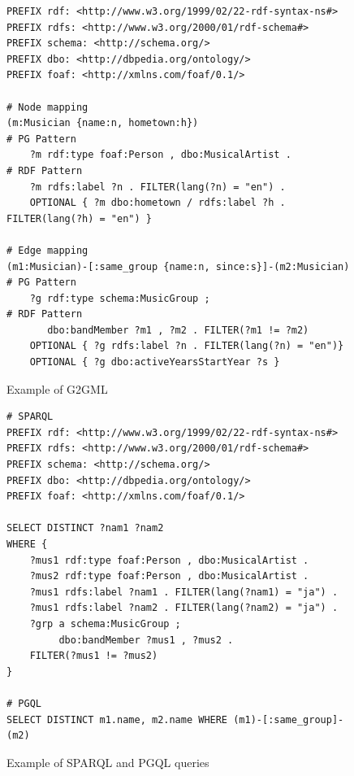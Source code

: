 \documentclass[runningheads]{llncs}
\begin{document}
\begin{figure}[!t]
\vspace{2mm}
\begin{scriptsize}
\begin{verbatim}
PREFIX rdf: <http://www.w3.org/1999/02/22-rdf-syntax-ns#>
PREFIX rdfs: <http://www.w3.org/2000/01/rdf-schema#>
PREFIX schema: <http://schema.org/>
PREFIX dbo: <http://dbpedia.org/ontology/>
PREFIX foaf: <http://xmlns.com/foaf/0.1/>
 
# Node mapping
(m:Musician {name:n, hometown:h})                            # PG Pattern
    ?m rdf:type foaf:Person , dbo:MusicalArtist .            # RDF Pattern
    ?m rdfs:label ?n . FILTER(lang(?n) = "en") .
    OPTIONAL { ?m dbo:hometown / rdfs:label ?h . FILTER(lang(?h) = "en") }
 
# Edge mapping
(m1:Musician)-[:same_group {name:n, since:s}]-(m2:Musician)  # PG Pattern
    ?g rdf:type schema:MusicGroup ;                          # RDF Pattern
       dbo:bandMember ?m1 , ?m2 . FILTER(?m1 != ?m2)
    OPTIONAL { ?g rdfs:label ?n . FILTER(lang(?n) = "en")}
    OPTIONAL { ?g dbo:activeYearsStartYear ?s }
\end{verbatim}
\end{scriptsize}
\caption{Example of G2GML}
\label{fig:g2gml}
\end{figure}
 
\begin{figure}[!t]
\vspace{2mm}
\begin{scriptsize}
\begin{verbatim}
# SPARQL
PREFIX rdf: <http://www.w3.org/1999/02/22-rdf-syntax-ns#>
PREFIX rdfs: <http://www.w3.org/2000/01/rdf-schema#>
PREFIX schema: <http://schema.org/>
PREFIX dbo: <http://dbpedia.org/ontology/>
PREFIX foaf: <http://xmlns.com/foaf/0.1/>
 
SELECT DISTINCT ?nam1 ?nam2
WHERE {
    ?mus1 rdf:type foaf:Person , dbo:MusicalArtist .
    ?mus2 rdf:type foaf:Person , dbo:MusicalArtist .
    ?mus1 rdfs:label ?nam1 . FILTER(lang(?nam1) = "ja") .
    ?mus1 rdfs:label ?nam2 . FILTER(lang(?nam2) = "ja") .
    ?grp a schema:MusicGroup ;
         dbo:bandMember ?mus1 , ?mus2 .
    FILTER(?mus1 != ?mus2)
}
 
# PGQL
SELECT DISTINCT m1.name, m2.name WHERE (m1)-[:same_group]-(m2)
\end{verbatim}
\end{scriptsize}
\caption{Example of SPARQL and PGQL queries}
\label{fig:sparql}
\end{figure}
 
\end{document}
